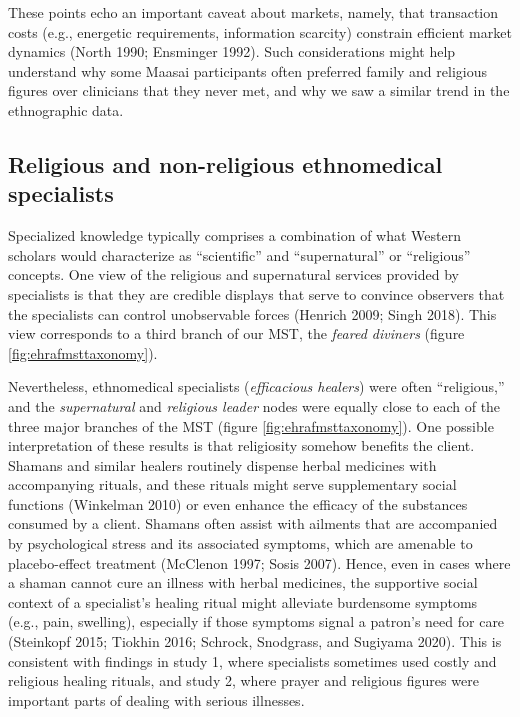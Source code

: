 \documentclass[
  11pt,
]{article}
\begin{document}
These points echo an important caveat about markets, namely, that transaction costs (e.g., energetic requirements, information scarcity) constrain efficient market dynamics (North 1990; Ensminger 1992). Such considerations might help understand why some Maasai participants often preferred family and religious figures over clinicians that they never met, and why we saw a similar trend in the ethnographic data.

\hypertarget{religious-and-non-religious-ethnomedical-specialists}{%
\subsection{Religious and non-religious ethnomedical specialists}\label{religious-and-non-religious-ethnomedical-specialists}}

Specialized knowledge typically comprises a combination of what Western scholars would characterize as ``scientific'' and ``supernatural'' or ``religious'' concepts. One view of the religious and supernatural services provided by specialists is that they are credible displays that serve to convince observers that the specialists can control unobservable forces (Henrich 2009; Singh 2018). This view corresponds to a third branch of our MST, the \emph{feared diviners} (figure \ref{fig:ehrafmsttaxonomy}).

Nevertheless, ethnomedical specialists (\emph{efficacious healers}) were often ``religious,'' and the \emph{supernatural} and \emph{religious leader} nodes were equally close to each of the three major branches of the MST (figure \ref{fig:ehrafmsttaxonomy}). One possible interpretation of these results is that religiosity somehow benefits the client. Shamans and similar healers routinely dispense herbal medicines with accompanying rituals, and these rituals might serve supplementary social functions (Winkelman 2010) or even enhance the efficacy of the substances consumed by a client. Shamans often assist with ailments that are accompanied by psychological stress and its associated symptoms, which are amenable to placebo-effect treatment (McClenon 1997; Sosis 2007). Hence, even in cases where a shaman cannot cure an illness with herbal medicines, the supportive social context of a specialist's healing ritual might alleviate burdensome symptoms (e.g., pain, swelling), especially if those symptoms signal a patron's need for care (Steinkopf 2015; Tiokhin 2016; Schrock, Snodgrass, and Sugiyama 2020). This is consistent with findings in study 1, where specialists sometimes used costly and religious healing rituals, and study 2, where prayer and religious figures were important parts of dealing with serious illnesses.
\end{document}
